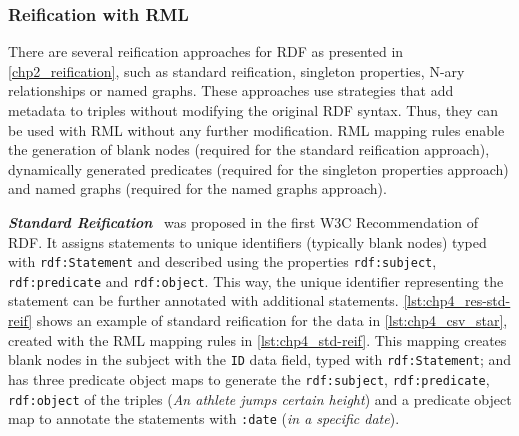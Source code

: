\subsubsection{Reification with RML}

There are several reification approaches for RDF as presented in \cref{chp2_reification}, such as standard reification, singleton properties, N-ary relationships or named graphs. 
These approaches use strategies that add metadata to triples
without modifying the original RDF syntax.
Thus, they can be used with RML without any further modification. RML mapping rules enable the generation of blank nodes (required for the standard reification approach), dynamically generated predicates (required for the singleton properties approach) and named graphs (required for the named graphs approach). %



\noindent\textbf{\textit{Standard Reification}}~\citep{lassila1999rdf} was proposed in the first W3C Recommendation of RDF.
It assigns statements to unique identifiers (typically blank nodes) typed with \texttt{rdf:Statement} and described using the properties \texttt{rdf:subject}, \texttt{rdf:predicate} and \texttt{rdf:object}.
This way, the unique identifier representing the statement can be further annotated with additional statements. \cref{lst:chp4_res-std-reif} shows an example of standard reification for the data in \cref{lst:chp4_csv_star}, created with the RML mapping rules in \cref{lst:chp4_std-reif}. 
This mapping creates blank nodes in the subject with the \texttt{ID} data field, typed with \texttt{rdf:Statement}; and has three predicate object maps to generate the \texttt{rdf:subject}, \texttt{rdf:predicate}, \texttt{rdf:object} of the triples (\textit{An athlete jumps certain height}) and a predicate object map to annotate the statements with \texttt{:date} (\textit{in a specific date}).




